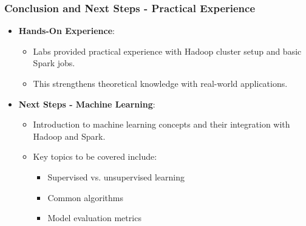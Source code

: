 \documentclass[aspectratio=169]{beamer}
\begin{document}
\begin{frame}[fragile]
    \frametitle{Conclusion and Next Steps - Practical Experience}
    \begin{itemize}
        \item \textbf{Hands-On Experience}:
        \begin{itemize}
            \item Labs provided practical experience with Hadoop cluster setup and basic Spark jobs.
            \item This strengthens theoretical knowledge with real-world applications.
        \end{itemize}
        
        \item \textbf{Next Steps - Machine Learning}:
        \begin{itemize}
            \item Introduction to machine learning concepts and their integration with Hadoop and Spark.
            \item Key topics to be covered include:
            \begin{itemize}
                \item Supervised vs. unsupervised learning
                \item Common algorithms
                \item Model evaluation metrics
            \end{itemize}
        \end{itemize}
    \end{itemize}
\end{frame}
\end{document}
